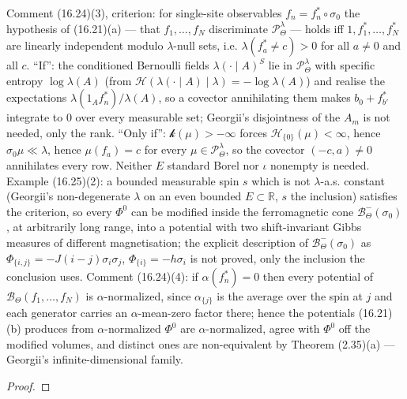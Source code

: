 \begin{theorem}
    Comment (16.24)(3), criterion: for single-site observables $f_n = f_n^*\circ\sigma_0$ the
    hypothesis of (16.21)(a) --- that $f_1,\dots,f_N$ discriminate $\mathcal P^\lambda_\Theta$ ---
    holds iff $1, f_1^*, \dots, f_N^*$ are linearly independent modulo $\lambda$-null sets, i.e.
    $\lambda(f_a^* \neq c) > 0$ for all $a \neq 0$ and all $c$. ``If'': the conditioned Bernoulli
    fields $\lambda(\cdot\mid A)^S$ lie in $\mathcal P^\lambda_\Theta$ with specific entropy
    $\log\lambda(A)$ (from $\mathcal H(\lambda(\cdot\mid A)\mid\lambda) = -\log\lambda(A)$) and realise
    the expectations $\lambda(1_A f_n^*)/\lambda(A)$, so a covector annihilating them makes
    $b_0 + f^*_{b'}$ integrate to $0$ over every measurable set; Georgii's disjointness of the $A_m$
    is not needed, only the rank. ``Only if'': $\mathcal k(\mu) > -\infty$ forces
    $\mathcal H_{\{0\}}(\mu) < \infty$, hence $\sigma_0\mu \ll \lambda$, hence $\mu(f_a) = c$ for
    every $\mu \in \mathcal P^\lambda_\Theta$, so the covector $(-c, a) \neq 0$ annihilates every
    row. Neither $E$ standard Borel nor $\iota$ nonempty is needed. Example (16.25)(2): a bounded
    measurable spin $s$ which is not $\lambda$-a.s. constant (Georgii's non-degenerate $\lambda$ on
    an even bounded $E \subset \mathbb R$, $s$ the inclusion) satisfies the criterion, so every
    $\Phi^0$ can be modified inside the ferromagnetic cone $\mathcal B^-_\Theta(\sigma_0)$, at
    arbitrarily long range, into a potential with two shift-invariant Gibbs measures of different
    magnetisation; the explicit description of $\mathcal B^-_\Theta(\sigma_0)$ as
    $\Phi_{\{i,j\}} = -J(i-j)\sigma_i\sigma_j$, $\Phi_{\{i\}} = -h\sigma_i$ is not proved, only the
    inclusion the conclusion uses. Comment (16.24)(4): if $\alpha(f_n^*) = 0$ then every potential
    of $\mathcal B_\Theta(f_1,\dots,f_N)$ is $\alpha$-normalized, since $\alpha_{\{j\}}$ is the
    average over the spin at $j$ and each generator carries an $\alpha$-mean-zero factor there;
    hence the potentials (16.21)(b) produces from $\alpha$-normalized $\Phi^0$ are
    $\alpha$-normalized, agree with $\Phi^0$ off the modified volumes, and distinct ones are
    non-equivalent by Theorem (2.35)(a) --- Georgii's infinite-dimensional family.
\end{theorem}
\begin{proof}
    \leanok
\end{proof}
